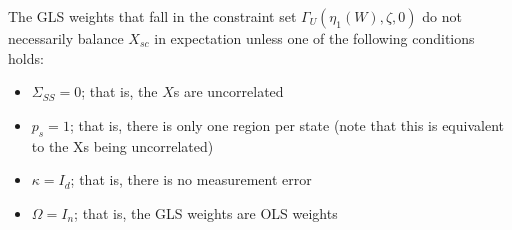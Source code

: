 \begin{proposition}
    The GLS weights that fall in the constraint set $\Gamma_U(\eta_1(W), \zeta, 0)$ do not necessarily balance $X_{sc}$ in expectation unless one of the following conditions holds:
    \begin{itemize}
    \item $\Sigma_{SS} = 0$; that is, the $X$s are uncorrelated
    \item $p_s = 1$; that is, there is only one region per state (note that this is equivalent to the Xs being uncorrelated)
    \item $\kappa = I_d$; that is, there is no measurement error
    \item $\Omega = I_n$; that is, the GLS weights are OLS weights
    \end{itemize}
\end{proposition}

